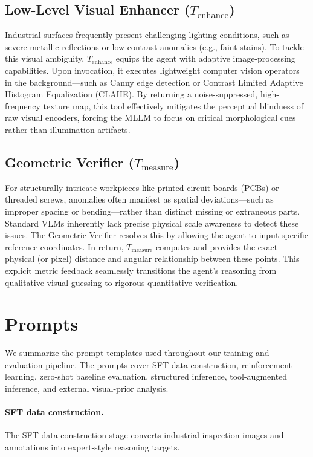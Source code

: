 \documentclass{article}
\begin{document}
{\subsection{Low-Level Visual Enhancer ($T_{\text{enhance}}$)}
Industrial surfaces frequently present challenging lighting conditions, such as severe metallic reflections or low-contrast anomalies (e.g., faint stains). To tackle this visual ambiguity, $T_{\text{enhance}}$ equips the agent with adaptive image-processing capabilities. Upon invocation, it executes lightweight computer vision operators in the background—such as Canny edge detection or Contrast Limited Adaptive Histogram Equalization (CLAHE). By returning a noise-suppressed, high-frequency texture map, this tool effectively mitigates the perceptual blindness of raw visual encoders, forcing the MLLM to focus on critical morphological cues rather than illumination artifacts.

\subsection{Geometric Verifier ($T_{\text{measure}}$)}
For structurally intricate workpieces like printed circuit boards (PCBs) or threaded screws, anomalies often manifest as spatial deviations—such as improper spacing or bending—rather than distinct missing or extraneous parts. Standard VLMs inherently lack precise physical scale awareness to detect these issues. The Geometric Verifier resolves this by allowing the agent to input specific reference coordinates. In return, $T_{\text{measure}}$ computes and provides the exact physical (or pixel) distance and angular relationship between these points. This explicit metric feedback seamlessly transitions the agent's reasoning from qualitative visual guessing to rigorous quantitative verification.




  \section{Prompts}
  \label{appx:prompt}

  We summarize the prompt templates used throughout our training and evaluation pipeline.
  The prompts cover SFT data construction, reinforcement learning, zero-shot baseline
  evaluation, structured inference, tool-augmented inference, and external visual-prior analysis.

  \paragraph{SFT data construction.}
  The SFT data construction stage converts industrial inspection images and annotations into
  expert-style reasoning targets.

}
\end{document}
